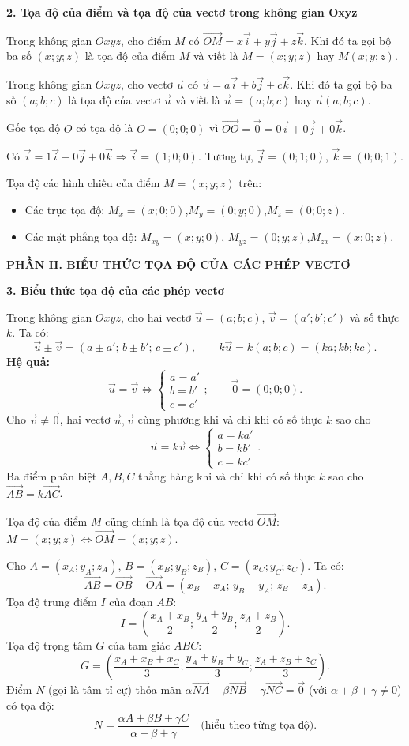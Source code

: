 \documentclass[12pt,a4paper]{article}
\newcommand{\partheading}[1]{\par\vspace{5pt}\noindent\textbf{\textcolor{sectionpurple}{#1}}\par\vspace{1pt}}
\newcommand{\tightitem}{\setlength{\itemsep}{1pt}\setlength{\topsep}{1pt}\setlength{\parsep}{0pt}\setlength{\partopsep}{0pt}}
\newcommand{\veczero}{\overrightarrow{0}}
\newcommand{\cvec}[1]{\overrightarrow{#1}}
\begin{document}
\textbf{2. Tọa độ của điểm và tọa độ của vectơ trong không gian Oxyz}

Trong không gian $Oxyz$, cho điểm $M$ có
$\cvec{OM}=x\vec i+y\vec j+z\vec k$. Khi đó ta gọi bộ ba số $(x;y;z)$
là tọa độ của điểm $M$ và viết là $M=(x;y;z)$ hay $M(x;y;z)$.

Trong không gian $Oxyz$, cho vectơ $\vec u$ có
$\vec u=a\vec i+b\vec j+c\vec k$. Khi đó ta gọi bộ ba số $(a;b;c)$
là tọa độ của vectơ $\vec u$ và viết là $\vec u=(a;b;c)$ hay $\vec u(a;b;c)$.

Gốc tọa độ $O$ có tọa độ là $O=(0;0;0)$ vì
$\cvec{OO}=\veczero=0\vec i+0\vec j+0\vec k$.

Có $\vec i=1\vec i+0\vec j+0\vec k\Rightarrow\vec i=(1;0;0)$.
Tương tự, $\vec j=(0;1;0)$, $\vec k=(0;0;1)$.

Tọa độ các hình chiếu của điểm $M=(x;y;z)$ trên:
\begin{itemize}\tightitem
  \item Các trục tọa độ: $M_x=(x;0;0)$,\enspace $M_y=(0;y;0)$,\enspace $M_z=(0;0;z)$.
  \item Các mặt phẳng tọa độ: $M_{xy}=(x;y;0)$,\enspace
  $M_{yz}=(0;y;z)$,\enspace $M_{zx}=(x;0;z)$.
\end{itemize}

\partheading{PHẦN II. BIỂU THỨC TỌA ĐỘ CỦA CÁC PHÉP VECTƠ}
\textbf{3. Biểu thức tọa độ của các phép vectơ}

Trong không gian $Oxyz$, cho hai vectơ $\vec u=(a;b;c)$,
$\vec v=(a';b';c')$ và số thực $k$. Ta có:
\[
 \vec u\pm\vec v=(a\pm a';\,b\pm b';\,c\pm c'),\qquad
 k\vec u=k(a;b;c)=(ka;kb;kc).
\]
\textbf{Hệ quả:}
\[
 \vec u=\vec v\iff
 \begin{cases}a=a'\\ b=b'\\c=c'\end{cases};
 \qquad \veczero=(0;0;0).
\]
Cho $\vec v\ne\veczero$, hai vectơ $\vec u,\vec v$ cùng phương khi và chỉ khi
có số thực $k$ sao cho
\[
 \vec u=k\vec v\iff
 \begin{cases}a=ka'\\b=kb'\\c=kc'\end{cases}.
\]
Ba điểm phân biệt $A,B,C$ thẳng hàng khi và chỉ khi có số thực $k$
sao cho $\cvec{AB}=k\cvec{AC}$.

Tọa độ của điểm $M$ cũng chính là tọa độ của vectơ $\cvec{OM}$:
$M=(x;y;z)\iff\cvec{OM}=(x;y;z)$.

Cho $A=(x_A;y_A;z_A)$, $B=(x_B;y_B;z_B)$, $C=(x_C;y_C;z_C)$. Ta có:
\[
 \cvec{AB}=\cvec{OB}-\cvec{OA}
 =(x_B-x_A;\,y_B-y_A;\,z_B-z_A).
\]
Tọa độ trung điểm $I$ của đoạn $AB$:
\[
 I=\left(\frac{x_A+x_B}{2};\frac{y_A+y_B}{2};\frac{z_A+z_B}{2}\right).
\]
Tọa độ trọng tâm $G$ của tam giác $ABC$:
\[
 G=\left(\frac{x_A+x_B+x_C}{3};
          \frac{y_A+y_B+y_C}{3};
          \frac{z_A+z_B+z_C}{3}\right).
\]
Điểm $N$ (gọi là tâm tỉ cự) thỏa mãn
$\alpha\cvec{NA}+\beta\cvec{NB}+\gamma\cvec{NC}=\veczero$
(với $\alpha+\beta+\gamma\ne0$) có tọa độ:
\[
 N=\frac{\alpha A+\beta B+\gamma C}{\alpha+\beta+\gamma}
 \quad\text{(hiểu theo từng tọa độ).}
\]
\end{document}
